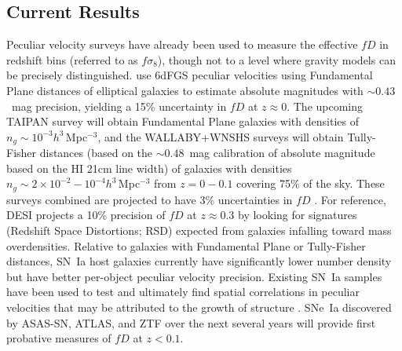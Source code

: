 \documentclass[11pt, oneside]{article}   	%
\begin{document}
\subsection{Current Results}
Peculiar velocity surveys have already been  used to measure
the effective $fD$ in redshift bins  (referred to as $f\sigma_8$), though not to a level where  gravity models can be precisely distinguished.
 \citet{2017MNRAS.471..839A} use 6dFGS peculiar velocities using  Fundamental Plane distances of elliptical galaxies to estimate absolute magnitudes
 with
 $\sim 0.43$~mag  precision, yielding a 15\% uncertainty in $fD$ at $z\approx 0$.
The upcoming 
TAIPAN survey \citep{2017PASA...34...47D} will obtain Fundamental Plane galaxies with densities of $n_g \sim 10^{-3}h^3$\,Mpc$^{-3}$,
and the WALLABY+WNSHS surveys \citep{2008ExA....22..151J} will obtain Tully-Fisher distances (based on the $\sim 0.48$~mag calibration of absolute magnitude based on the  HI 21cm line width)
of galaxies with densities $n_g \sim 2\times 10^{-2} - 10^{-4} h^3$\,Mpc$^{-3}$ from
$z=0-0.1$ covering 75\% of the sky.
These surveys combined are projected to have 3\% uncertainties in $fD$ \citep{2017MNRAS.464.2517H}.
For reference, DESI projects a 10\% precision of $fD$ at $z \approx 0.3$  by looking 
for signatures (Redshift Space Distortions; RSD) expected from galaxies infalling toward mass overdensities.
Relative to galaxies with  Fundamental Plane or Tully-Fisher distances, 
SN~Ia host galaxies currently have significantly lower number density but have better per-object peculiar velocity precision.
Existing SN~Ia samples
have been used to test and ultimately find spatial correlations in peculiar velocities that may be attributed to the growth of structure
\citep{PhysRevLett.99.081301,2008MNRAS.389L..47A,2014MNRAS.444.3926J,2015JCAP...12..033H, 2017JCAP...05..015H}.
SNe~Ia discovered by ASAS-SN, ATLAS, and ZTF \citep{2014ApJ...788...48S,2018PASP..130f4505T,2019PASP..131a8002B} over the next several years will provide first probative measures of $fD$ at $z<0.1$.
\end{document}
